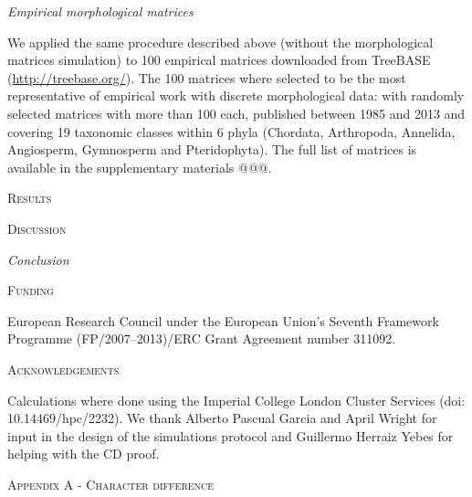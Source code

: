 \documentclass[12pt,letterpaper]{article}
\renewcommand{\section}[1]{%
\bigskip
\begin{center}
\begin{Large}
\normalfont\scshape #1
\medskip
\end{Large}
\end{center}}
\renewcommand{\subsection}[1]{%
\bigskip
\begin{center}
\begin{large}
\normalfont\itshape #1
\end{large}
\end{center}}
\begin{document}
\subsection{Empirical morphological matrices}

We applied the same procedure described above (without the morphological matrices simulation) to 100 empirical matrices downloaded from TreeBASE (\url{http://treebase.org/}).
The 100 matrices where selected to be the most representative of empirical work with discrete morphological data: with randomly selected matrices with more than 100 each, published between 1985 and 2013 and covering 19 taxonomic classes within 6 phyla (Chordata, Arthropoda, Annelida, Angiosperm, Gymnosperm and Pteridophyta).
The full list of matrices is available in the supplementary materials @@@.

\section{Results}


\section{Discussion}


\subsection{Conclusion}


\section{Funding}
European Research Council under the European Union’s Seventh Framework Programme (FP/2007–2013)/ERC Grant Agreement number 311092.


\section{Acknowledgements}
Calculations where done using the Imperial College London Cluster Services (doi: 10.14469/hpc/2232).
We thank Alberto Pascual Garcia and April Wright for input in the design of the simulations protocol and Guillermo Herraiz Yebes for helping with the CD proof.





\section{Appendix A - Character difference}
\end{document}
